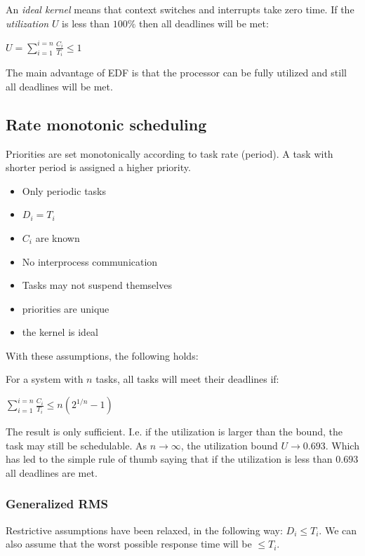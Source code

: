 \documentclass[a4paper]{article}
\begin{document}
An \emph{ideal kernel} means that context switches and interrupts take zero time.
If the \emph{utilization} $U$ is less than $100\%$ then all deadlines will be met:

\begin{center}
$U = \sum_{i=1}^{i=n} \frac{C_i}{T_i} \leq 1$
\end{center}

The main advantage of EDF is that the processor can be fully utilized and still
all deadlines will be met.

\subsection{Rate monotonic scheduling}

Priorities are set monotonically according to task rate (period). A task with
shorter period is assigned a higher priority.

\begin{itemize}
  \item Only periodic tasks
  \item $D_i = T_i$
  \item $C_i$ are known
  \item No interprocess communication
  \item Tasks may not suspend themselves
  \item priorities are unique
  \item the kernel is ideal
\end{itemize}

With these assumptions, the following holds:

For a system with $n$ tasks, all tasks will meet their deadlines if:

\begin{center}
  $ \sum_{i=1}^{i=n} \frac{C_i}{T_i} \leq n(2^{1/n} - 1) $
\end{center}

The result is only sufficient. I.e. if the utilization is larger than the bound,
the task may still be schedulable. As $n \rightarrow \infty$, the utilization
bound $U \rightarrow 0.693$. Which has led to the simple rule of thumb saying
that if the utilization is less than $0.693$ all deadlines are met.

\subsubsection{Generalized RMS}
Restrictive assumptions have been relaxed, in the following way: $D_i \leq T_i$.
We can also assume that the worst possible response time will be $\leq T_i$.
\end{document}
